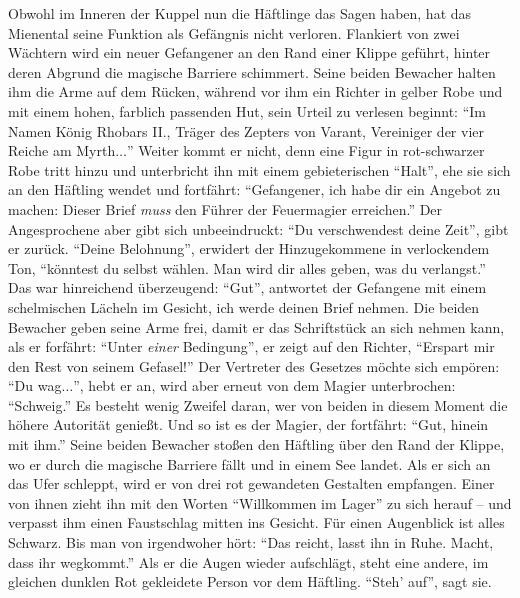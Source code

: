\documentclass[a5paper,pagesize]{scrbook}
\begin{document}
Obwohl im Inneren der Kuppel nun die Häftlinge das Sagen haben, hat das Mienental seine Funktion als Gefängnis nicht verloren.
Flankiert von zwei Wächtern wird ein neuer Gefangener an den Rand einer Klippe geführt, hinter deren Abgrund die magische Barriere schimmert.
Seine beiden Bewacher halten ihm die Arme auf dem Rücken, während vor ihm ein Richter in gelber Robe und mit einem hohen, farblich passenden Hut, sein Urteil zu verlesen beginnt:
\enquote{Im Namen König Rhobars II., Träger des Zepters von Varant, Vereiniger der vier Reiche am Myrth$\ldots$}
Weiter kommt er nicht, denn eine Figur in rot-schwarzer Robe tritt hinzu und unterbricht ihn mit einem gebieterischen \enquote{Halt}, ehe sie sich an den Häftling wendet und fortfährt:
\enquote{Gefangener, ich habe dir ein Angebot zu machen:
Dieser Brief \textit{muss} den Führer der Feuermagier erreichen.}
Der Angesprochene aber gibt sich unbeeindruckt:
\enquote{Du verschwendest deine Zeit}, gibt er zurück.
\enquote{Deine Belohnung}, erwidert der Hinzugekommene in verlockendem Ton, \enquote{könntest du selbst wählen.
Man wird dir alles geben, was du verlangst.}
Das war hinreichend überzeugend:
\enquote{Gut}, antwortet der Gefangene mit einem schelmischen Lächeln im Gesicht, {ich werde deinen Brief nehmen.}
Die beiden Bewacher geben seine Arme frei, damit er das Schriftstück an sich nehmen kann, als er forfährt:
\enquote{Unter \textit{einer} Bedingung}, er zeigt auf den Richter, \enquote{Erspart mir den Rest von seinem Gefasel!}
Der Vertreter des Gesetzes möchte sich empören:
\enquote{Du wag$\ldots$}, hebt er an, wird aber erneut von dem Magier unterbrochen:
\enquote{Schweig.}
Es besteht wenig Zweifel daran, wer von beiden in diesem Moment die höhere Autorität genießt.
Und so ist es der Magier, der fortfährt:
\enquote{Gut, hinein mit ihm.}
Seine beiden Bewacher stoßen den Häftling über den Rand der Klippe, wo er durch die magische Barriere fällt und in einem See landet.
Als er sich an das Ufer schleppt, wird er von drei rot gewandeten Gestalten empfangen.
Einer von ihnen zieht ihn mit den Worten \enquote{Willkommen im Lager} zu sich herauf -- und verpasst ihm einen Faustschlag mitten ins Gesicht.
Für einen Augenblick ist alles Schwarz.
Bis man von irgendwoher hört:
\enquote{Das reicht, lasst ihn in Ruhe.
Macht, dass ihr wegkommt.}
Als er die Augen wieder aufschlägt, steht eine andere, im gleichen dunklen Rot gekleidete Person vor dem Häftling.
\enquote{Steh' auf}, sagt sie.
\end{document}
